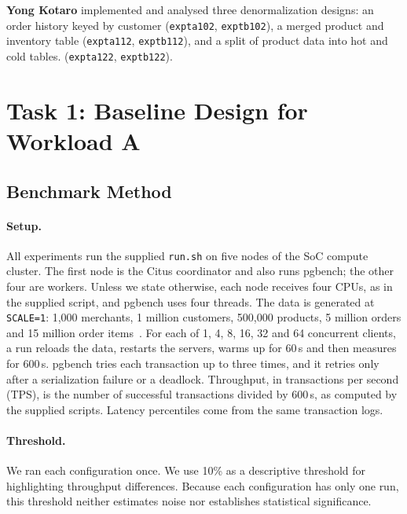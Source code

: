 \documentclass[sigconf,10pt,nonacm]{acmart}
\newcommand{\expt}[1]{\texttt{expt\textunderscore #1}}
\renewcommand{\_}{\underscorewithoutbreak\allowbreak}
\begin{document}
\textbf{Yong Kotaro} implemented and analysed three denormalization designs: an order
history keyed by customer (\expt{a102}, \expt{b102}), a merged product and inventory
table (\expt{a112}, \expt{b112}), and a split of product data into hot and cold tables. (\expt{a122}, \expt{b122}).

\clearpage

\section{Task 1: Baseline Design for Workload A}
\label{sec:task1}

\subsection{Benchmark Method}
\label{sec:method}

\paragraph{Setup.} All experiments run the supplied \texttt{run.sh} on five nodes of the
SoC compute cluster. The first node is the Citus coordinator and also runs pgbench; the
other four are workers. Unless we state otherwise, each node receives four CPUs, as in
the supplied script, and pgbench uses four threads. The data is generated at
\texttt{SCALE=1}: 1,000 merchants, 1 million customers, 500,000 products, 5 million
orders and 15 million order items~\cite{brief}. For each of 1, 4, 8, 16, 32 and 64
concurrent clients, a run reloads the data, restarts the servers, warms up for 60\,s
and then measures for 600\,s. pgbench tries each transaction up to three times, and it
retries only after a serialization failure or a deadlock. Throughput, in transactions
per second (TPS), is the number of successful transactions divided by 600\,s, as
computed by the supplied scripts. Latency percentiles come from the same transaction
logs.

\paragraph{Threshold.} We ran each configuration once. We use 10\% as a descriptive
threshold for highlighting throughput differences. Because each configuration has only
one run, this threshold neither estimates noise nor establishes statistical
significance.
\end{document}
